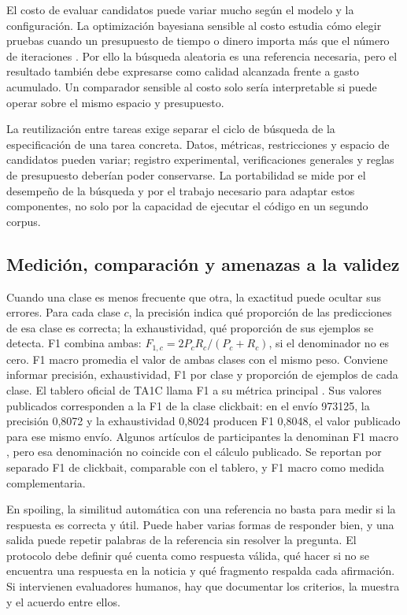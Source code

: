 El costo de evaluar candidatos puede variar mucho según el modelo y la configuración. La optimización bayesiana sensible al costo estudia cómo elegir pruebas cuando un presupuesto de tiempo o dinero importa más que el número de iteraciones \citep{lee2020costawarebo}. Por ello la búsqueda aleatoria es una referencia necesaria, pero el resultado también debe expresarse como calidad alcanzada frente a gasto acumulado. Un comparador sensible al costo solo sería interpretable si puede operar sobre el mismo espacio y presupuesto.

La reutilización entre tareas exige separar el ciclo de búsqueda de la especificación de una tarea concreta. Datos, métricas, restricciones y espacio de candidatos pueden variar; registro experimental, verificaciones generales y reglas de presupuesto deberían poder conservarse. La portabilidad se mide por el desempeño de la búsqueda y por el trabajo necesario para adaptar estos componentes, no solo por la capacidad de ejecutar el código en un segundo corpus.

\subsection{Medición, comparación y amenazas a la validez}
\label{sec:evaluacion}

Cuando una clase es menos frecuente que otra, la exactitud puede ocultar sus errores. Para cada clase $c$, la precisión indica qué proporción de las predicciones de esa clase es correcta; la exhaustividad, qué proporción de sus ejemplos se detecta. F1 combina ambas: $F_{1,c}=2P_cR_c/(P_c+R_c)$, si el denominador no es cero. F1 macro promedia el valor de ambas clases con el mismo peso. Conviene informar precisión, exhaustividad, F1 por clase y proporción de ejemplos de cada clase. El tablero oficial de TA1C llama F1 a su métrica principal \citep{ta1c2025}. Sus valores publicados corresponden a la F1 de la clase clickbait: en el envío 973125, la precisión 0,8072 y la exhaustividad 0,8024 producen F1 0,8048, el valor publicado para ese mismo envío. Algunos artículos de participantes la denominan F1 macro \citep{fing2025}, pero esa denominación no coincide con el cálculo publicado. Se reportan por separado F1 de clickbait, comparable con el tablero, y F1 macro como medida complementaria.

En spoiling, la similitud automática con una referencia no basta para medir si la respuesta es correcta y útil. Puede haber varias formas de responder bien, y una salida puede repetir palabras de la referencia sin resolver la pregunta. El protocolo debe definir qué cuenta como respuesta válida, qué hacer si no se encuentra una respuesta en la noticia y qué fragmento respalda cada afirmación. Si intervienen evaluadores humanos, hay que documentar los criterios, la muestra y el acuerdo entre ellos.

